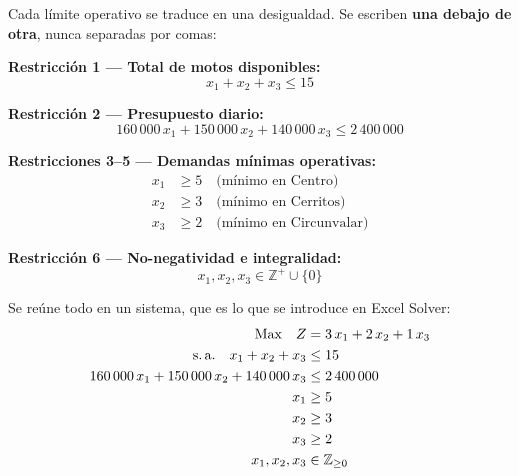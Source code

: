 \documentclass[11pt, a4paper]{article}
\begin{document}
\begin{cajaPaso}
Cada l\'imite operativo se traduce en una desigualdad. Se escriben \textbf{una debajo de otra}, nunca separadas por comas:

\textbf{Restricci\'on 1 --- Total de motos disponibles:}
\begin{equation*}
x_1 + x_2 + x_3 \leq 15
\end{equation*}

\textbf{Restricci\'on 2 --- Presupuesto diario:}
\begin{equation*}
160\,000\,x_1 + 150\,000\,x_2 + 140\,000\,x_3 \leq 2\,400\,000
\end{equation*}

\textbf{Restricciones 3--5 --- Demandas m\'inimas operativas:}
\begin{align*}
x_1 &\geq 5 \quad\text{(m\'inimo en Centro)}\\
x_2 &\geq 3 \quad\text{(m\'inimo en Cerritos)}\\
x_3 &\geq 2 \quad\text{(m\'inimo en Circunvalar)}
\end{align*}

\textbf{Restricci\'on 6 --- No-negatividad e integralidad:}
\begin{equation*}
x_1, x_2, x_3 \in \mathbb{Z}^{+} \cup \{0\}
\end{equation*}
\end{cajaPaso}

\begin{cajaPaso}
Se re\'une todo en un sistema, que es lo que se introduce en Excel Solver:
\begin{equation*}
\begin{aligned}
\text{Max}\quad Z &= 3\,x_1 + 2\,x_2 + 1\,x_3\\
\text{s.\,a.}\quad
x_1 + x_2 + x_3 &\leq 15\\
160\,000\,x_1 + 150\,000\,x_2 + 140\,000\,x_3 &\leq 2\,400\,000\\
x_1 &\geq 5\\
x_2 &\geq 3\\
x_3 &\geq 2\\
x_1, x_2, x_3 &\in \mathbb{Z}_{\geq 0}
\end{aligned}
\end{equation*}
\end{cajaPaso}
\end{document}
